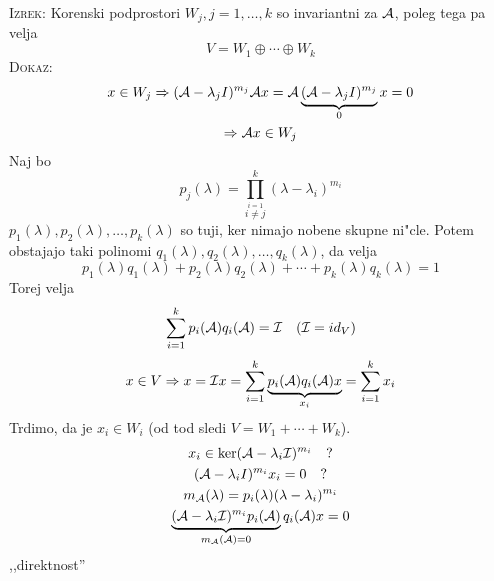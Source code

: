 \textsc{Izrek:} Korenski podprostori $W_j, j = 1, \ldots, k$ so invariantni za $\mathcal{A}$, poleg tega pa velja
\begin{equation*}
V = W_1 \oplus \cdots \oplus W_k
\end{equation*}
\textsc{Dokaz:} 
\begin{gather*}
x \in W_j \Rightarrow (\mathcal{A} - \lambda_j I)^{m_j} \mathcal{A} x = \mathcal{A} \underbrace{(\mathcal{A} - \lambda_jI)^{m_j}}_0 x = 0 \\
\Rightarrow \mathcal{A} x \in W_j
\end{gather*}
Naj bo 
\begin{equation*}
p_j (\lambda) = \prod_{\stackrel{i = 1}{i \neq j}}^{k} (\lambda - \lambda_i)^{m_i}
\end{equation*}
$p_1(\lambda), p_2(\lambda), \ldots, p_k(\lambda)$ so tuji, ker nimajo nobene skupne ni"cle. Potem obstajajo taki polinomi $q_1(\lambda), q_2(\lambda), \ldots, q_k(\lambda)$, da velja
\begin{equation*}
p_1(\lambda) q_1(\lambda) + p_2(\lambda)q_2(\lambda) + \cdots + p_k(\lambda)q_k(\lambda) = 1
\end{equation*}
Torej velja
\begin{equation*}
\sum_{i =1}^{k}p_i(\mathcal{A})q_i(\mathcal{A}) = \mathcal{I} \quad (\mathcal{I} = id_V)
\end{equation*}
\begin{equation*}
x \in V \Rightarrow x = \mathcal{I} x = \sum_{i = 1}^{k}\underbrace{p_i(\mathcal{A})q_i(\mathcal{A})x}_{x_i} = \sum_{i=1}^k x_i
\end{equation*}
Trdimo, da je $x_i \in W_i$ (od tod sledi $V = W_1 + \cdots + W_k$).
\begin{gather*}
x_i \in \ker(\mathcal{A} - \lambda_i \mathcal{I})^{m_i} \quad ? \\
(\mathcal{A} - \lambda_i I)^{m_i} x_i = 0 \quad ? \\
m_{\mathcal{A}} (\lambda) = p_i(\lambda) ( \lambda - \lambda_i)^{m_i} \\
\underbrace{(\mathcal{A} - \lambda_i \mathcal{I})^{m_i} p_i(\mathcal{A})}_{m_{\mathcal{A}}(\mathcal{A}) = 0} q_i(\mathcal{A}) x = 0
\end{gather*}
 \quad ,,direktnost''
